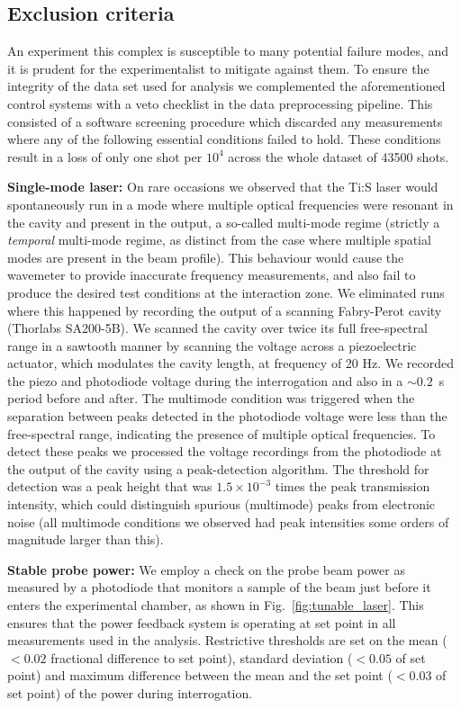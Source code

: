 \label{sec:TO_analysis}

\subsection{Exclusion criteria}

	An experiment this complex is susceptible to many potential failure modes, and it is prudent for the experimentalist to mitigate against them.
	To ensure the integrity of the data set used for analysis we complemented the aforementioned control systems with a veto checklist in the data preprocessing pipeline.
	This consisted of a software screening procedure which discarded any measurements where any of the following essential conditions failed to hold. These conditions result in a loss of only one shot per $10^{4}$ across the whole dataset of 43500 shots. 



	\textbf{Single-mode laser:}	On rare occasions we observed that the Ti:S laser would spontaneously run in a mode where multiple optical frequencies were resonant in the cavity and present in the output, a so-called multi-mode regime (strictly a \emph{temporal} multi-mode regime, as distinct from the case where multiple spatial modes are present in the beam profile). This behaviour would cause the wavemeter to provide inaccurate frequency measurements, and also fail to produce the desired test conditions at the interaction zone. We eliminated runs where this happened by recording the output of a scanning Fabry-Perot cavity (Thorlabs SA200-5B). We scanned the cavity over twice its full free-spectral range in a sawtooth manner by scanning the voltage across a piezoelectric actuator, which modulates the cavity length, at frequency of 20 Hz. 
	We recorded the piezo and photodiode voltage during the interrogation and also in a $\sim0.2$~s period before and after.
	The multimode condition was triggered when the separation between peaks detected in the photodiode voltage were less than the free-spectral range, indicating the presence of multiple optical frequencies.
	To detect these peaks we processed the voltage recordings from the photodiode at the output of the cavity using a peak-detection algorithm. The threshold for detection was a peak height that was $1.5\times10^{-3}$ times the peak transmission intensity, which could distinguish spurious (multimode) peaks from electronic noise (all multimode conditions we  observed had peak intensities some orders of magnitude larger than this).

	\textbf{Stable probe power:}		We employ a check on the probe beam power as measured by a photodiode that monitors a sample of the beam just before it enters the experimental chamber, as shown in Fig.~\ref{fig:tunable_laser}. This ensures that the power feedback system is operating at set point in all measurements used in the analysis. Restrictive thresholds are set on the mean ($<0.02$ fractional difference to set point), standard deviation ($<0.05$ of set point) and maximum difference between the mean and the set point ($<0.03$ of set point) of the power during interrogation.

